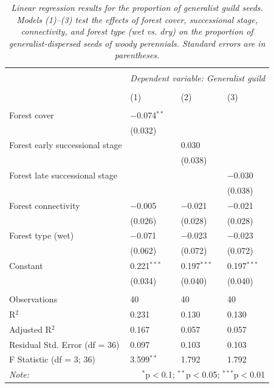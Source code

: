 \newpage
\begin{table}[H]
\centering
\scriptsize %
\caption{\textit{Linear regression results for the proportion of generalist guild seeds. Models (1)–(3) test the effects of forest cover, successional stage, connectivity, and forest type (wet vs. dry) on the proportion of generalist-dispersed seeds of woody perennials. Standard errors are in parentheses.}}
\begin{tabularx}{\textwidth}{@{\extracolsep{3pt}}lXXX} 
\\[-1ex]\hline 
\hline \\[-1ex] 
 & \multicolumn{3}{c}{\textit{Dependent variable: Generalist guild}} \\ 
\\[-1ex] & (1) & (2) & (3)\\ 
\hline \\[-0.8ex] 
Forest cover & $-$0.074$^{**}$ &  &  \\ 
 & (0.032) &  &  \\ 
Forest early successional stage &  & 0.030 &  \\ 
 &  & (0.038) &  \\ 
Forest late successional stage &  &  & $-$0.030 \\ 
 &  &  & (0.038) \\ 
Forest connectivity & $-$0.005 & $-$0.021 & $-$0.021 \\ 
 & (0.026) & (0.028) & (0.028) \\ 
Forest type (wet) & $-$0.071 & $-$0.023 & $-$0.023 \\ 
 & (0.062) & (0.072) & (0.072) \\ 
Constant & 0.221$^{***}$ & 0.197$^{***}$ & 0.197$^{***}$ \\ 
 & (0.034) & (0.040) & (0.040) \\ 
\hline \\[-0.8ex] 
Observations & 40 & 40 & 40 \\ 
R$^{2}$ & 0.231 & 0.130 & 0.130 \\ 
Adjusted R$^{2}$ & 0.167 & 0.057 & 0.057 \\ 
Residual Std. Error (df = 36) & 0.097 & 0.103 & 0.103 \\ 
F Statistic (df = 3; 36) & 3.599$^{**}$ & 1.792 & 1.792 \\ 
\hline 
\textit{Note:} & \multicolumn{3}{r}{$^{*}$p$<$0.1; $^{**}$p$<$0.05; $^{***}$p$<$0.01} \\ 
\end{tabularx} 
\label{tab:generalist}
\end{table} 

